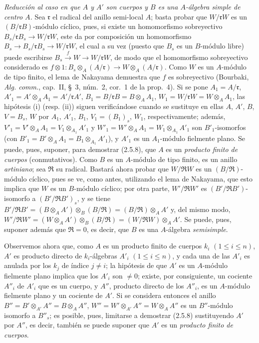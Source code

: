 \begin{env}[2.5.8.8]
\label{IV.2.5.8.8-fr}
\emph{Reducción al caso en que $A$ y $A'$ son cuerpos y $B$ es una $A$-álgebra
simple de centro $A$.} Sea $\mathfrak r$ el radical del anillo semi-local $A$;
basta probar que $W/\mathfrak rW$ es un $(B/\mathfrak rB)$-módulo cíclico,
pues, si existe un homomorfismo sobreyectivo
$B_s/\mathfrak rB_s\to W/\mathfrak rW$, este da por composición un
homomorfismo $B_s\to B_s/\mathfrak rB_s\to W/\mathfrak rW$, el cual a su vez
(puesto que $B_s$ es un $B$-módulo libre) puede escribirse
$B_s\xrightarrow{f}W\to W/\mathfrak rW$, de modo que el homomorfismo
sobreyectivo considerado es
$f\otimes1:B_s\otimes_A(A/\mathfrak r)\longrightarrow W\otimes_A(A/\mathfrak r)$.
Como $W$ es un $A$-módulo de tipo finito, el lema de Nakayama demuestra que
$f$ es sobreyectivo (Bourbaki, \emph{Alg. comm.}, cap.~II, \S~3,
núm.~2, cor.~1 de la prop.~4). Si se pone $A_1=A/\mathfrak r$, $A'_1=A'\otimes_A A_1=A'/\mathfrak rA'$,
$B_1=B/\mathfrak rB=B\otimes_A A_1$, $W_1=W/\mathfrak rW=W\otimes_A A_1$,
las hipótesis (i) (resp. (ii)) siguen verificándose cuando se sustituye en ellas
$A$, $A'$, $B$, $V=B_s$, $W$ por $A_1$, $A'_1$, $B_1$,
$V_1=(B_1)_s$, $W_1$, respectivamente; además,
$V'_1=V'\otimes_A A_1=V_1\otimes_{A_1}A'_1$ y
$W'_1=W'\otimes_A A_1=W_1\otimes_{A_1}A'_1$ son $B'_1$-isomorfos (con
$B'_1=B'\otimes_A A_1=B_1\otimes_{A_1}A'_1$), y $A'_1$ es un $A_1$-módulo
fielmente plano. Se puede, pues, suponer, para demostrar (2.5.8), que $A$ es un
\emph{producto finito de cuerpos} (conmutativos). Como $B$ es un $A$-módulo de
tipo finito, es un anillo \emph{artiniano}; sea $\mathfrak R$ su radical. Bastará ahora
probar que $W/\mathfrak RW$ es un $(B/\mathfrak R)$-módulo cíclico, pues se ve,
como antes, utilizando el lema de Nakayama, que esto implica que $W$ es un
$B$-módulo cíclico; por otra parte, $W'/\mathfrak RW'$ es
$(B'/\mathfrak RB')$-isomorfo a $(B'/\mathfrak RB')_s$, y se tiene
$B'/\mathfrak RB'=(B\otimes_A A')\otimes_B(B/\mathfrak R)=(B/\mathfrak R)\otimes_A A'$
y, del mismo modo,
$W'/\mathfrak RW'=(W\otimes_A A')\otimes_B(B/\mathfrak R)=(W/\mathfrak RW)\otimes_A A'$.
Se puede, pues, suponer además que $\mathfrak R=0$, es decir, que $B$ es una
$A$-álgebra \emph{semisimple}.

Observemos ahora que, como $A$ es un producto finito de cuerpos $k_i$
$(1\leq i\leq n)$, $A'$ es producto directo de $k_i$-álgebras $A'_i$
$(1\leq i\leq n)$, y cada una de las $A'_i$ es anulada por los $k_j$ de índice
$j\ne i$; la hipótesis de que $A'$ es un $A$-módulo fielmente plano implica
que los $A'_i$ son $\ne0$; existe, por consiguiente, un cociente $A''_i$ de
$A'_i$ que es un cuerpo, y $A''$, producto directo de los $A''_i$, es un
$A$-módulo fielmente plano y un cociente de $A'$. Si se considera entonces el
anillo $B''=B'\otimes_{A'}A''=B\otimes_A A''$,
$W''=W'\otimes_{A'}A''=W\otimes_A A''$ es un $B''$-módulo isomorfo a
$B''_s$; es posible, pues, limitarse a demostrar (2.5.8) sustituyendo $A'$ por
$A''$, es decir, también se puede suponer que $A'$ es un \emph{producto finito
de cuerpos}.


\end{env}
